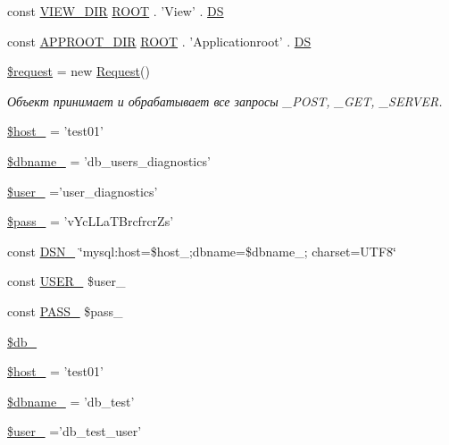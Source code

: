 \begin{DoxyCompactItemize}
\item 
const \hyperlink{conf_8php_ab03c61889740a358477b63e1060ed780}{V\-I\-E\-W\-\_\-\-D\-I\-R} \hyperlink{conf___8php_a18c0644836e196aed6d63779e14d6bd8}{R\-O\-O\-T} . 'View' . \hyperlink{conf___8php_ae073998f73900b8375397889044c8313}{D\-S}
\item 
const \hyperlink{conf_8php_ae32575aa3e9747cd2ffbf47d3bd53850}{A\-P\-P\-R\-O\-O\-T\-\_\-\-D\-I\-R} \hyperlink{conf___8php_a18c0644836e196aed6d63779e14d6bd8}{R\-O\-O\-T} . 'Applicationroot' . \hyperlink{conf___8php_ae073998f73900b8375397889044c8313}{D\-S}
\item 
\hyperlink{conf_8php_abb35c8495a232b510389fa6d7b15d38a}{\$request} = new \hyperlink{class_request}{Request}()
\begin{DoxyCompactList}\small\item\em Объект принимает и обрабатывает все запросы \-\_\-\-P\-O\-S\-T, \-\_\-\-G\-E\-T, \-\_\-\-S\-E\-R\-V\-E\-R. \end{DoxyCompactList}\item 
\hyperlink{group___d_b__1_gaaef75b195cd712a695148aa5ea925ff6}{\$host\-\_} = 'test01'
\item 
\hyperlink{group___d_b__1_gab06b43f5844a74e58c253d1313d698c7}{\$dbname\-\_} = 'db\-\_\-users\-\_\-diagnostics'
\item 
\hyperlink{group___d_b__1_gaa3ccf4fb708509a71be03fc744a99d58}{\$user\-\_} ='user\-\_\-diagnostics'
\item 
\hyperlink{group___d_b__1_ga41dc8c99445163effebda89820668a55}{\$pass\-\_} = 'v\-Yc\-L\-La\-T\-Brcfrcr\-Zs'
\item 
const \hyperlink{group___d_b__1_ga8ed489df371f2fa8bb344efb8d65bc9c}{D\-S\-N\-\_} \char`\"{}mysql\-:host=\$host\-\_;dbname=\$dbname\-\_; charset=U\-T\-F8\char`\"{}
\item 
const \hyperlink{group___d_b__1_ga2b39766e2bf04cce22a7deee95879619}{U\-S\-E\-R\-\_} \$user\-\_
\item 
const \hyperlink{group___d_b__1_ga5a1b531167aa8e2f89c1f9bf9b32ddf3}{P\-A\-S\-S\-\_} \$pass\-\_
\item 
\hyperlink{group___d_b__1_ga76fa04d1db973b91108c60680e5b956f}{\$db\-\_}
\item 
\hyperlink{group___d_b__2_ga1fca5ca6a998917bdf494cfd985b6025}{\$host\-\_} = 'test01'
\item 
\hyperlink{group___d_b__2_gae40cd9ac0cdd9542398e94e75a970c0c}{\$dbname\-\_} = 'db\-\_\-test'
\item 
\hyperlink{group___d_b__2_gaf33b43cdfbb1e0ca41bfd37425fc6bfe}{\$user\-\_} ='db\-\_\-test\-\_\-user'

\end{DoxyCompactItemize}
